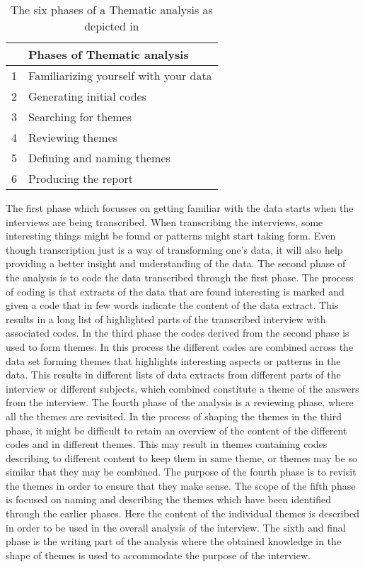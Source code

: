 \begin{table}[H]
\centering
\begin{tabular}[width=\textwidth]{cl}
\hline
& Phases of Thematic analysis \\ \hline
1 & Familiarizing yourself with your data \\
2 & Generating initial codes \\
3 & Searching for themes \\
4 & Reviewing themes \\
5 & Defining and naming themes\\
6 & Producing the report \\ \hline
\end{tabular}
\caption{The six phases of a Thematic analysis as depicted in \parencite[87]{PDF:Braun2006}}
\label{ThematicPhases}
\end{table}

The first phase which focusses on getting familiar with the data starts when the interviews are being transcribed. When transcribing the interviews, some interesting things might be found or patterns might start taking form. Even though transcription just is a way of transforming one's data, it will also help providing a better insight and understanding of the data. The second phase of the analysis is to code the data transcribed through the first phase. The process of coding is that extracts of the data that are found interesting is marked and given a code that in few words indicate the content of the data extract. This results in a long list of highlighted parts of the transcribed interview with associated codes. In the third phase the codes derived from the second phase is used to form themes. In this process the different codes are combined across the data set forming themes that highlights interesting aspects or patterns in the data. This results in different lists of data extracts from different parts of the interview or different subjects, which combined constitute a theme of the answers from the interview. The fourth phase of the analysis is a reviewing phase, where all the themes are revisited. In the process of shaping the themes in the third phase, it might be difficult to retain an overview of the content of the different codes and in different themes. This may result in themes containing codes describing to different content to keep them in same theme, or themes may be so similar that they may be combined. The purpose of the fourth phase is to revisit the themes in order to ensure that they make sense. The scope of the fifth phase is focused on naming and describing the themes which have been identified through the earlier phases. Here the content of the individual themes is described in order to be used in the overall analysis of the interview. The sixth and final phase is the writing part of the analysis where the obtained knowledge in the shape of themes is used to accommodate the purpose of the interview.



